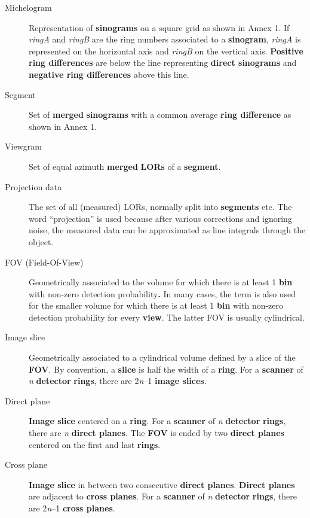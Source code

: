 \documentclass{article}
\begin{document}
\begin{description}
\item[Michelogram] 
Representation of \textbf{sinograms} on a square grid as shown in 
Annex 1. If \textit{ringA} and \textit{ringB} are the ring numbers associated 
to a \textbf{sinogram}, \textit{ringA} is represented on the horizontal 
axis and \textit{ringB} on the vertical axis. \textbf{Positive ring differences} 
are below the line representing \textbf{direct sinograms} and \textbf{negative 
ring differences} above this line.

\item[Segment] 
Set of \textbf{merged} \textbf{sinograms} with a common average \textbf{ring 
difference} as shown in Annex 1.

\item[Viewgram] 
Set of equal azimuth \textbf{merged} \textbf{LORs} of a \textbf{segment}.

\item[Projection data]
The set of all (measured) LORs, normally split into \textbf{segments} etc.
The word ``projection'' is used because after various corrections and
ignoring noise, the measured data can be approximated as line integrals 
through the object.
\item[FOV (Field-Of-View)] 
Geometrically associated to the volume for which there is at 
least 1 \textbf{bin} with non-zero detection probability\textbf{.} In many 
cases, the term is also used for the smaller volume for which 
there is at least 1 \textbf{bin} with non-zero detection probability 
for every \textbf{view}. The latter FOV is usually cylindrical.

\item[Image slice] 
Geometrically associated to a cylindrical volume defined by 
a slice of the \textbf{FOV}. By convention, a \textbf{slice} is half the 
width of a \textbf{ring}. For a \textbf{scanner} of \textit{n} \textbf{detector} \textbf{rings}, 
there are 2\textit{n}--1 \textbf{image slices}.

\item[Direct plane] 
\textbf{Image slice} centered on a \textbf{ring}. For a \textbf{scanner} of \textit{n} \textbf{detector} \textbf{rings}, 
there are \textit{n} \textbf{direct planes}. The \textbf{FOV} is ended by two \textbf{direct 
planes} centered on the first and last \textbf{rings}.

\item[Cross plane] 
\textbf{Image slice} in between two consecutive \textbf{direct planes}. \textbf{Direct 
planes} are adjacent to \textbf{cross planes}. For a \textbf{scanner} of \textit{n} \textbf{detector} \textbf{rings}, 
there are 2\textit{n}--1 \textbf{cross planes}.
\end{description}
\end{document}
